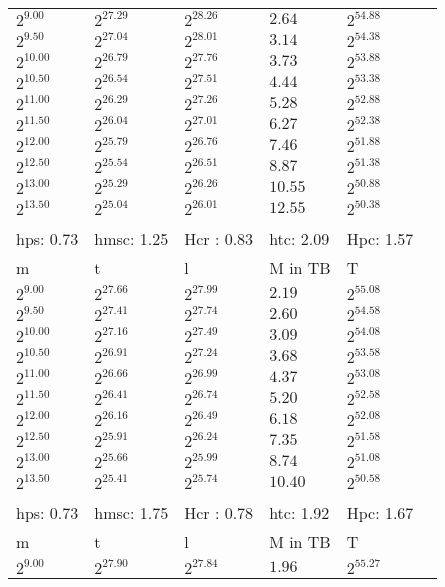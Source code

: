 \begin{tabular}{llllll}
$2^{9.00}$ & $2^{27.29}$ & $2^{28.26}$ & $2.64$ & $2^{54.88}$ \\
$2^{9.50}$ & $2^{27.04}$ & $2^{28.01}$ & $3.14$ & $2^{54.38}$ \\
$2^{10.00}$ & $2^{26.79}$ & $2^{27.76}$ & $3.73$ & $2^{53.88}$ \\
$2^{10.50}$ & $2^{26.54}$ & $2^{27.51}$ & $4.44$ & $2^{53.38}$ \\
$2^{11.00}$ & $2^{26.29}$ & $2^{27.26}$ & $5.28$ & $2^{52.88}$ \\
$2^{11.50}$ & $2^{26.04}$ & $2^{27.01}$ & $6.27$ & $2^{52.38}$ \\
$2^{12.00}$ & $2^{25.79}$ & $2^{26.76}$ & $7.46$ & $2^{51.88}$ \\
$2^{12.50}$ & $2^{25.54}$ & $2^{26.51}$ & $8.87$ & $2^{51.38}$ \\
$2^{13.00}$ & $2^{25.29}$ & $2^{26.26}$ & $10.55$ & $2^{50.88}$ \\
$2^{13.50}$ & $2^{25.04}$ & $2^{26.01}$ & $12.55$ & $2^{50.38}$ \\
 &  &  &  &  &  \\
hps: 0.73 & hmsc: 1.25 & Hcr : 0.83 & htc: 2.09 & Hpc: 1.57 &  \\
m & t & l & M in TB & T \\
$2^{9.00}$ & $2^{27.66}$ & $2^{27.99}$ & $2.19$ & $2^{55.08}$ \\
$2^{9.50}$ & $2^{27.41}$ & $2^{27.74}$ & $2.60$ & $2^{54.58}$ \\
$2^{10.00}$ & $2^{27.16}$ & $2^{27.49}$ & $3.09$ & $2^{54.08}$ \\
$2^{10.50}$ & $2^{26.91}$ & $2^{27.24}$ & $3.68$ & $2^{53.58}$ \\
$2^{11.00}$ & $2^{26.66}$ & $2^{26.99}$ & $4.37$ & $2^{53.08}$ \\
$2^{11.50}$ & $2^{26.41}$ & $2^{26.74}$ & $5.20$ & $2^{52.58}$ \\
$2^{12.00}$ & $2^{26.16}$ & $2^{26.49}$ & $6.18$ & $2^{52.08}$ \\
$2^{12.50}$ & $2^{25.91}$ & $2^{26.24}$ & $7.35$ & $2^{51.58}$ \\
$2^{13.00}$ & $2^{25.66}$ & $2^{25.99}$ & $8.74$ & $2^{51.08}$ \\
$2^{13.50}$ & $2^{25.41}$ & $2^{25.74}$ & $10.40$ & $2^{50.58}$ \\
 &  &  &  &  &  \\
hps: 0.73 & hmsc: 1.75 & Hcr : 0.78 & htc: 1.92 & Hpc: 1.67 &  \\
m & t & l & M in TB & T \\
$2^{9.00}$ & $2^{27.90}$ & $2^{27.84}$ & $1.96$ & $2^{55.27}$ \\

\end{tabular}
